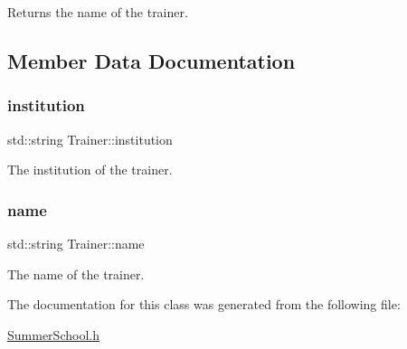 Returns the name of the trainer. 



\subsection{Member Data Documentation}
\mbox{\label{classTrainer_ae895aa7f146d8bf271399215d4ede36b}} 
\subsubsection{\texorpdfstring{institution}{institution}}
{\footnotesize\ttfamily std\+::string Trainer\+::institution\hspace{0.3cm}{\ttfamily [private]}}



The institution of the trainer. 

\mbox{\label{classTrainer_a6b58d4cfdb8d3482cb2c09dd366a6350}} 
\subsubsection{\texorpdfstring{name}{name}}
{\footnotesize\ttfamily std\+::string Trainer\+::name\hspace{0.3cm}{\ttfamily [private]}}



The name of the trainer. 



The documentation for this class was generated from the following file\+:\begin{DoxyCompactItemize}
\item 
\hyperlink{SummerSchool_8h}{Summer\+School.\+h}\end{DoxyCompactItemize}
